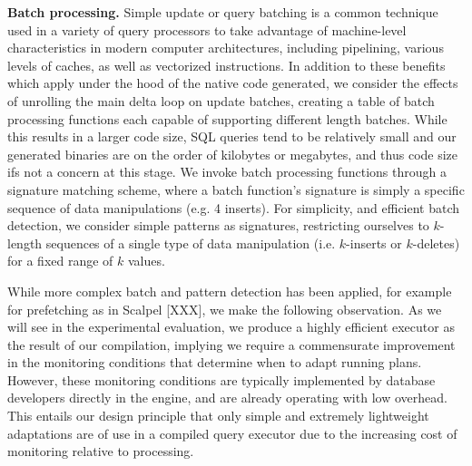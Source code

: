 \textbf{Batch processing.} 
Simple update or query batching is a common technique used in a variety of query
processors to take advantage of machine-level characteristics in modern computer
architectures, including pipelining, various levels of caches, as well as
vectorized instructions. In addition to these benefits which apply under the hood
of the native code generated, we consider the effects of unrolling the main delta
loop on update batches, creating a table of batch processing functions each
capable of supporting different length batches. While this results in a larger
code size, SQL queries tend to be relatively small and our generated binaries are
on the order of kilobytes or megabytes, and thus code size ifs not a concern at
this stage. We invoke batch processing functions through a signature matching
scheme, where a batch function's signature is simply a specific sequence of data
manipulations (e.g. 4 inserts). For simplicity, and efficient batch detection, we
consider simple patterns as signatures, restricting ourselves to $k$-length
sequences of a single type of data manipulation (i.e. $k$-inserts or $k$-deletes)
for a fixed range of $k$ values.

While more complex batch and pattern detection has been applied, for example
for prefetching as in Scalpel [XXX], we make the following observation. As we
will see in the experimental evaluation, we produce a highly efficient executor
as the result of our compilation, implying we require a commensurate
improvement in the monitoring conditions that determine when to adapt running
plans. However, these monitoring conditions are typically implemented by
database developers directly in the engine, and are already operating with
low overhead. This entails our design principle that only simple and extremely
lightweight adaptations are of use in a compiled query executor due to the
increasing cost of monitoring relative to processing.

